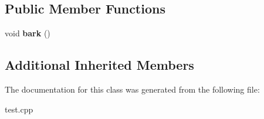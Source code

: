 \subsection*{Public Member Functions}
\begin{DoxyCompactItemize}
\item 
\hypertarget{class_dog_ad3ab5661e3663948a486ff73049b1e1f}{void {\bfseries bark} ()}\label{class_dog_ad3ab5661e3663948a486ff73049b1e1f}

\end{DoxyCompactItemize}
\subsection*{Additional Inherited Members}


The documentation for this class was generated from the following file\-:\begin{DoxyCompactItemize}
\item 
test.\-cpp\end{DoxyCompactItemize}
